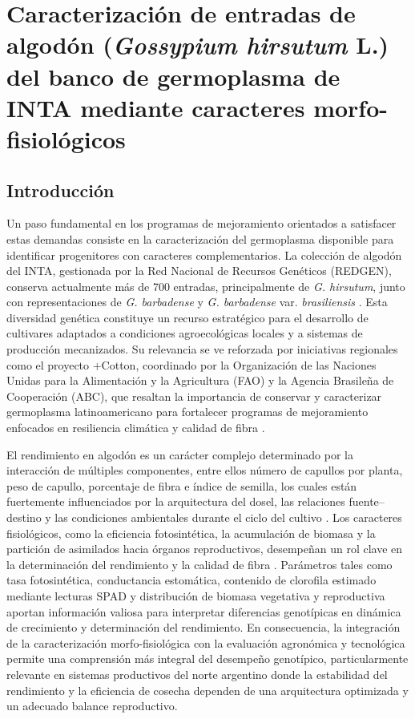 \documentclass[12pt,oneside]{reedthesis}
\begin{document}
\chapter{\texorpdfstring{Caracterización de entradas de algodón (\emph{Gossypium hirsutum} L.) del banco de germoplasma de INTA mediante caracteres morfo-fisiológicos}{Caracterización de entradas de algodón (Gossypium hirsutum L.) del banco de germoplasma de INTA mediante caracteres morfo-fisiológicos}}\label{rmd-basics}

\section{Introducción}\label{introducciuxf3n}

Un paso fundamental en los programas de mejoramiento orientados a satisfacer estas demandas consiste en la caracterización del germoplasma disponible para identificar progenitores con caracteres complementarios. La colección de algodón del INTA, gestionada por la Red Nacional de Recursos Genéticos (REDGEN), conserva actualmente más de 700 entradas, principalmente de \emph{G. hirsutum}, junto con representaciones de \emph{G. barbadense} y \emph{G. barbadense} var. \emph{brasiliensis} \autocite{arriel2023}. Esta diversidad genética constituye un recurso estratégico para el desarrollo de cultivares adaptados a condiciones agroecológicas locales y a sistemas de producción mecanizados. Su relevancia se ve reforzada por iniciativas regionales como el proyecto +Cotton, coordinado por la Organización de las Naciones Unidas para la Alimentación y la Agricultura (FAO) y la Agencia Brasileña de Cooperación (ABC), que resaltan la importancia de conservar y caracterizar germoplasma latinoamericano para fortalecer programas de mejoramiento enfocados en resiliencia climática y calidad de fibra \autocite{fao2025}.

El rendimiento en algodón es un carácter complejo determinado por la interacción de múltiples componentes, entre ellos número de capullos por planta, peso de capullo, porcentaje de fibra e índice de semilla, los cuales están fuertemente influenciados por la arquitectura del dosel, las relaciones fuente--destino y las condiciones ambientales durante el ciclo del cultivo \autocite{pettigrew2004,constable2015}. Los caracteres fisiológicos, como la eficiencia fotosintética, la acumulación de biomasa y la partición de asimilados hacia órganos reproductivos, desempeñan un rol clave en la determinación del rendimiento y la calidad de fibra \autocite{constable2015}. Parámetros tales como tasa fotosintética, conductancia estomática, contenido de clorofila estimado mediante lecturas SPAD y distribución de biomasa vegetativa y reproductiva aportan información valiosa para interpretar diferencias genotípicas en dinámica de crecimiento y determinación del rendimiento. En consecuencia, la integración de la caracterización morfo-fisiológica con la evaluación agronómica y tecnológica permite una comprensión más integral del desempeño genotípico, particularmente relevante en sistemas productivos del norte argentino donde la estabilidad del rendimiento y la eficiencia de cosecha dependen de una arquitectura optimizada y un adecuado balance reproductivo.
\end{document}
